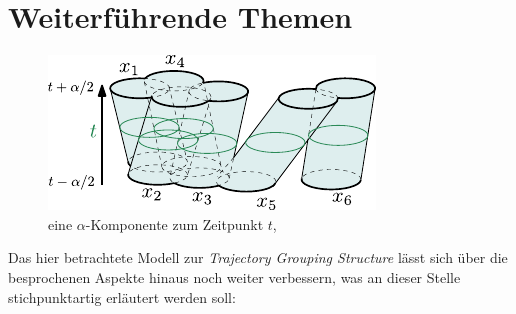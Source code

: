 \section{Weiterführende Themen}
\begin{figure}[tp]
    \Centering
    \includegraphics[width=.5\textwidth]{Bilder/alpha-component}
    \caption{eine $\alpha$-Komponente zum Zeitpunkt $t$, \cite[Fig:~11]{buchin2015}}\label{fig:alpha}
\end{figure}
Das hier betrachtete Modell zur \emph{Trajectory Grouping Structure} lässt sich über die besprochenen Aspekte hinaus noch weiter verbessern, was an dieser Stelle stichpunktartig erläutert werden soll:
